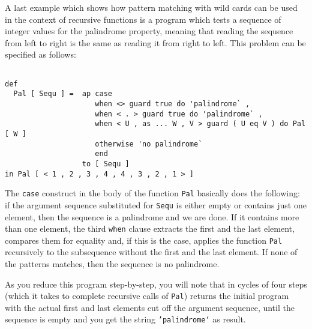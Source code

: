 A last example which shows how pattern matching with wild cards can be used in 
the context of recursive functions is a program which tests a sequence of
integer values for the {\mys palindrome} property, meaning that reading the 
sequence from left to right is the same as reading it from right to left. This problem
can be specified as follows:
\begin{verbatim}

def 
  Pal [ Sequ ] =  ap case 
                     when <> guard true do 'palindrome` ,
                     when < . > guard true do 'palindrome` ,
                     when < U , as ... W , V > guard ( U eq V ) do Pal [ W ]
                     otherwise 'no palindrome`
                     end
                  to [ Sequ ]
in Pal [ < 1 , 2 , 3 , 4 , 4 , 3 , 2 , 1 > ]

\end{verbatim}
The {\tt case} construct in the body of the function {\tt Pal}
basically does the following: if the argument sequence substituted for {\tt Sequ}
is either empty or contains just one element, then the sequence is a palindrome
and we are done. If it contains more than one element, the third {\tt when}
clause extracts the first and the last element, compares them for equality and, if this
is the case, applies the function {\tt Pal} recursively to the subsequence without the
first and the last element. If none of the patterns matches, then the sequence is no
palindrome.

As you reduce this program step-by-step, you will note that in cycles of four steps
(which it takes to complete recursive calls of {\tt Pal}) \pired returns the initial program
 with the actual first and last elements cut off the argument sequence, until the sequence is
empty and you get the string {\tt 'palindrome`} as result. 
